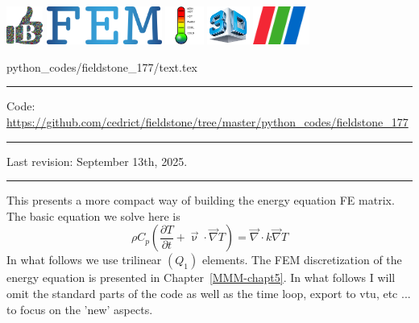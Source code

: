 \noindent
\includegraphics[height=1.25cm]{images/pictograms/benchmark}
\includegraphics[height=1.25cm]{images/pictograms/FEM}
\includegraphics[height=1.25cm]{images/pictograms/temperature}
\includegraphics[height=1.25cm]{images/pictograms/3d}
\includegraphics[height=1.25cm]{images/pictograms/paraview}


\begin{flushright} {\tiny {\color{gray} python\_codes/fieldstone\_177/text.tex}} \end{flushright}

\par\noindent\rule{\textwidth}{0.4pt}

\begin{center}
\inpython
{\small Code: \url{https://github.com/cedrict/fieldstone/tree/master/python_codes/fieldstone_177}}
\end{center}

\par\noindent\rule{\textwidth}{0.4pt}

Last revision: September 13th, 2025.

\par\noindent\rule{\textwidth}{0.4pt}


This \stone presents a more compact way of building the energy equation FE matrix. 
The basic equation we solve here is
\[
\rho C_p \left( \frac{\partial T}{\partial t} + \vec\upnu \cdot \vec\nabla T \right)
= \vec\nabla \cdot k \vec\nabla T 
\]
In what follows we use trilinear $(Q_1)$ elements.
The FEM discretization of the energy equation is presented in Chapter~\ref{MMM-chapt5}.
In what follows I will omit the standard parts of the code as well as the time loop, export to vtu, etc ...
to focus on the 'new' aspects.

